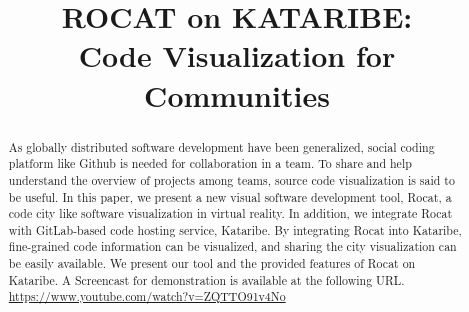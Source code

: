 \documentclass[conference]{IEEEtran}
\begin{document}
\title{ROCAT on KATARIBE:\\ Code Visualization for Communities}

\author{

}

\maketitle

\begin{abstract}
As globally distributed software development have been generalized, social coding platform like Github is needed for collaboration in a team. To share and help understand the overview of projects among teams, source code visualization is said to be useful.
In this paper, we present a new visual software development tool, Rocat, a code city like software visualization in virtual reality. In addition, we integrate Rocat with GitLab-based code hosting service, Kataribe. By integrating Rocat into Kataribe, fine-grained code information can be visualized, and sharing the city visualization can be easily available. We present our tool and the provided features of Rocat on Kataribe.
A Screencast for demonstration is available at the following URL.\\
\url{https://www.youtube.com/watch?v=ZQTTO91v4No}
\end{abstract}
\end{document}
